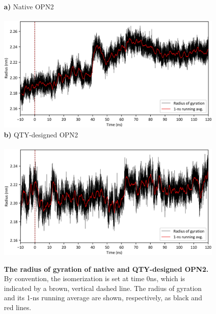 \documentclass[fleqn,12pt]{supp}
\begin{document}
\begin{figure}[H]
    \caption{\textbf{The radius of gyration of native and QTY-designed OPN2. } By convention, the isomerization is set at time 0ns, which is indicated by a brown, vertical dashed line. The radius of gyration and its 1-ns running average are shown, respectively, as black and red lines. }
    \textbf{a)} Native OPN2 \\ \\
    \includegraphics[width=\linewidth]{SuppFigures/wt gyrate.jpg}
    \textbf{b)} QTY-designed OPN2 \\ \\
    \includegraphics[width=\linewidth]{SuppFigures/qty gyrate.jpg}
\end{figure}
\end{document}
